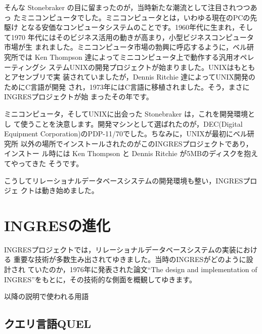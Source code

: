 そんな Stonebraker の目に留まったのが，当時新たな潮流として注目されつつあっ
たミニコンピュータでした。ミニコンピュータとは，いわゆる現在のPCの先駆け
となる安価なコンピュータシステムのことです。1960年代に生まれ，そして1970
年代にはそのビジネス活用の動きが高まり，小型ビジネスコンピュータ市場が生
まれました。ミニコンピュータ市場の勃興に呼応するように，ベル研究所では
Ken Thompson 達によってミニコンピュータ上で動作する汎用オペレーティングシ
ステムUNIXの開発プロジェクトが始まりました。UNIXはもともとアセンブリで実
装されていましたが，Dennis Ritchie 達によってUNIX開発のためにC言語が開発
され，1973年にはC言語に移植されました。そう，まさにINGRESプロジェクトが始
まったその年です。


ミニコンピュータ，そしてUNIXに出会った Stonebraker は，これを開発環境とし
て使うことを決意します。開発マシンとして選ばれたのが，DEC(Digital
Equipment Corporation)のPDP-11/70でした。ちなみに，UNIXが最初にベル研究所
以外の場所でインストールされたのがこのINGRESプロジェクトであり，インストー
ル時には Ken Thompson と Dennis Ritchie が5MBのディスクを抱えてやってきた
そうです。


こうしてリレーショナルデータベースシステムの開発環境も整い，INGRESプロジェ
クトは動き始めました。


\section{INGRESの進化}


INGRESプロジェクトでは，リレーショナルデータベースシステムの実装における
重要な技術が多数生み出されてゆきました。当時のINGRESがどのように設計され
ていたのか，1976年に発表された論文``The design and implementation of
INGRES''をもとに，その技術的な側面を概観してゆきます。


\begin{center}
 \begin{minipage}{0.95\textwidth}
  \begin{screen}
   以降の説明で使われる用語


   \footnotesize




  \end{screen}
 \end{minipage}
 \vspace*{0.6\Cvs}
\end{center}


\subsection{クエリ言語QUEL}


